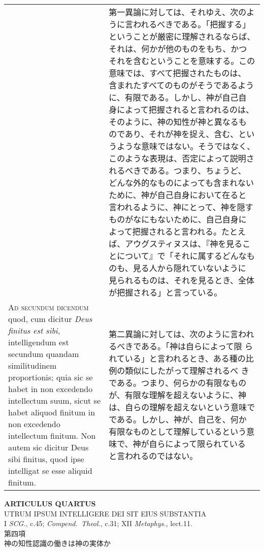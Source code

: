 \documentclass[10pt]{jsarticle} %
\begin{document}
\begin{longtable}{p{21em}p{21em}}
&

第一異論に対しては、それゆえ、次のように言われるべきである。「把握する」
ということが厳密に理解されるならば、それは、何かが他のものをもち、かつ
それを含むということを意味する。この意味では、すべて把握されたものは、
含まれたすべてのものがそうであるように、有限である。しかし、神が自己自
身によって把握されると言われるのは、そのように、神の知性が神と異なるも
のであり、それが神を捉え、含む、というような意味ではない。そうではなく、
このような表現は、否定によって説明されるべきである。つまり、ちょうど、
どんな外的なものによっても含まれないために、神が自己自身において在ると
言われるように、神にとって、神を隠すものがなにもないために、自己自身に
よって把握されると言われる。たとえば、アウグスティヌスは、『神を見るこ
とについて』で「それに属するどんなものも、見る人から隠れていないように
見られるものは、それを見るとき、全体が把握される」と言っている。

\\


{\scshape Ad secundum dicendum} quod, cum dicitur {\itshape Deus
finitus est sibi}, intelligendum est secundum quandam similitudinem
proportionis; quia sic se habet in non excedendo intellectum suum,
sicut se habet aliquod finitum in non excedendo intellectum
finitum. Non autem sic dicitur Deus sibi finitus, quod ipse intelligat
se esse aliquid finitum.

&

第二異論に対しては、次のように言われるべきである。「神は自らによって限
られている」と言われるとき、ある種の比例の類似にしたがって理解されるべ
きである。つまり、何らかの有限なものが、有限な理解を超えないように、神
は、自らの理解を超えないという意味でである。しかし、神が、自己を、何か
有限なものとして理解しているという意味で、神が自らによって限られている
と言われるのではない。



\end{longtable}
\newpage


\begin{center}
{\Large {\bf ARTICULUS QUARTUS}}\\ {\large UTRUM IPSUM INTELLIGERE DEI
SIT EIUS SUBSTANTIA}\\ {\footnotesize I {\itshape SCG.}, c.45;
{\itshape Compend.~Theol.}, c.31; XII {\itshape Metaphys.},
lect.11.}\\ {\Large 第四項\\神の知性認識の働きは神の実体か}
\end{center}
\end{document}
